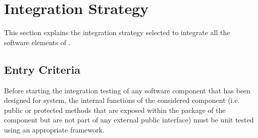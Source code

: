 \section{Integration Strategy}
This section explains the integration strategy selected to integrate all the software elements of \myTaxiService{}.

\subsection{Entry Criteria}
Before starting the integration testing of any software component that has been designed for \myTaxiService{} system, the internal functions of the considered component (i.e. public or protected methods that are exposed within the package of the component but are not part of any external public interface) must be unit tested using an appropriate framework.

